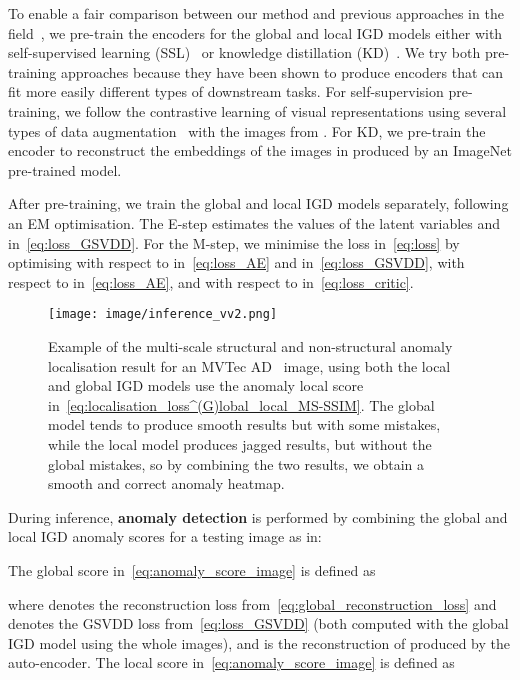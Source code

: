 \documentclass[final]{cvpr}
\begin{document}
To enable a fair comparison between our method and previous approaches in the field~\cite{bergmann2020uninformed,venkataramanan2019attention,bergman2020classification,golan2018deep}, we pre-train the encoders for the global and local IGD models either with self-supervised learning (SSL)~\cite{chen2020simple}
or knowledge distillation (KD)~\cite{bergmann2020uninformed,gou2020knowledge,hinton2015distilling}. 
We try both pre-training approaches because they have been shown to produce encoders that can fit more easily different types of downstream tasks.
For self-supervision pre-training, we follow the contrastive learning of visual representations using several types of data augmentation~\cite{chen2020simple} with the images from . 
For KD, we pre-train the encoder  to reconstruct the embeddings of the images in  produced by an ImageNet pre-trained model. 


After pre-training, we train the global and local IGD models separately, following an EM optimisation.  The E-step estimates the values of the latent variables  and  in~\eqref{eq:loss_GSVDD}.
For the M-step, we minimise the loss in~\eqref{eq:loss} by optimising  with respect to  in~\eqref{eq:loss_AE} and  in~\eqref{eq:loss_GSVDD},  with respect to  in~\eqref{eq:loss_AE}, and  with respect to  in~\eqref{eq:loss_critic}.  





\begin{figure}[t!]
    \centering
    \texttt{[image: image/inference\_vv2.png]}
   \caption{Example of the multi-scale structural and non-structural anomaly localisation result for an MVTec AD~\cite{mvtecad} image, using both the local and global IGD models use the anomaly local score  in~\eqref{eq:localisation_loss^(G)lobal_local_MS-SSIM}. The global model tends to produce smooth results but with some mistakes, while the local model produces jagged results, but without the global mistakes, so by combining the two results, we obtain a smooth and correct anomaly heatmap.  }
    \label{fig:multi-test}
\end{figure}

During inference, \textbf{anomaly detection} is performed by combining the global and local IGD anomaly scores for a testing image  as in:

The global score in~\eqref{eq:anomaly_score_image} is defined as

where  denotes the reconstruction loss from~\eqref{eq:global_reconstruction_loss} and  denotes the GSVDD loss from~\eqref{eq:loss_GSVDD} (both computed with the global IGD model using the whole images), and  is the reconstruction of  produced by the auto-encoder.  The local score in~\eqref{eq:anomaly_score_image} is defined as
\end{document}
